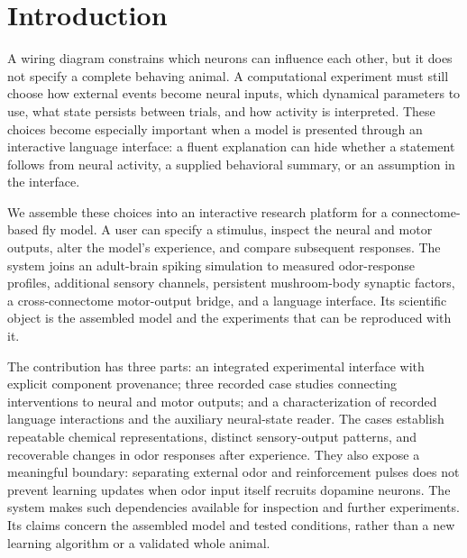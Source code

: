 \section{Introduction}
A wiring diagram constrains which neurons can influence each other, but it does not specify a complete behaving animal. A computational experiment must still choose how external events become neural inputs, which dynamical parameters to use, what state persists between trials, and how activity is interpreted. These choices become especially important when a model is presented through an interactive language interface: a fluent explanation can hide whether a statement follows from neural activity, a supplied behavioral summary, or an assumption in the interface.

We assemble these choices into an interactive research platform for a connectome-based fly model. A user can specify a stimulus, inspect the neural and motor outputs, alter the model's experience, and compare subsequent responses. The system joins an adult-brain spiking simulation to measured odor-response profiles, additional sensory channels, persistent mushroom-body synaptic factors, a cross-connectome motor-output bridge, and a language interface. Its scientific object is the assembled model and the experiments that can be reproduced with it.

The contribution has three parts: an integrated experimental interface with explicit component provenance; three recorded case studies connecting interventions to neural and motor outputs; and a characterization of recorded language interactions and the auxiliary neural-state reader. The cases establish repeatable chemical representations, distinct sensory-output patterns, and recoverable changes in odor responses after experience. They also expose a meaningful boundary: separating external odor and reinforcement pulses does not prevent learning updates when odor input itself recruits dopamine neurons. The system makes such dependencies available for inspection and further experiments. Its claims concern the assembled model and tested conditions, rather than a new learning algorithm or a validated whole animal.
